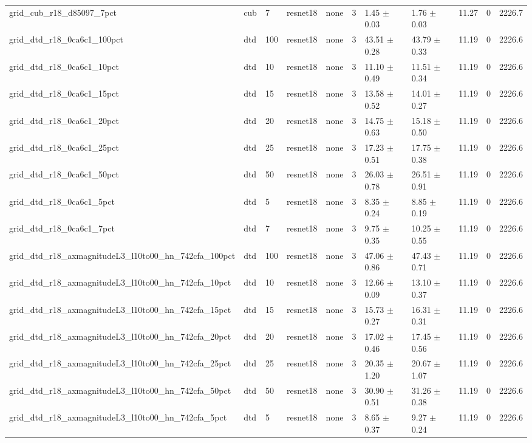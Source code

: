 \begin{tabular}{lllllllllll}
grid_cub_r18_d85097_7pct & cub & 7 & resnet18 & none & 3 & 1.45 $\pm$ 0.03 & 1.76 $\pm$ 0.03 & 11.27 & 0 & 2226.7 \\
grid_dtd_r18_0ca6c1_100pct & dtd & 100 & resnet18 & none & 3 & 43.51 $\pm$ 0.28 & 43.79 $\pm$ 0.33 & 11.19 & 0 & 2226.6 \\
grid_dtd_r18_0ca6c1_10pct & dtd & 10 & resnet18 & none & 3 & 11.10 $\pm$ 0.49 & 11.51 $\pm$ 0.34 & 11.19 & 0 & 2226.6 \\
grid_dtd_r18_0ca6c1_15pct & dtd & 15 & resnet18 & none & 3 & 13.58 $\pm$ 0.52 & 14.01 $\pm$ 0.27 & 11.19 & 0 & 2226.6 \\
grid_dtd_r18_0ca6c1_20pct & dtd & 20 & resnet18 & none & 3 & 14.75 $\pm$ 0.63 & 15.18 $\pm$ 0.50 & 11.19 & 0 & 2226.6 \\
grid_dtd_r18_0ca6c1_25pct & dtd & 25 & resnet18 & none & 3 & 17.23 $\pm$ 0.51 & 17.75 $\pm$ 0.38 & 11.19 & 0 & 2226.6 \\
grid_dtd_r18_0ca6c1_50pct & dtd & 50 & resnet18 & none & 3 & 26.03 $\pm$ 0.78 & 26.51 $\pm$ 0.91 & 11.19 & 0 & 2226.6 \\
grid_dtd_r18_0ca6c1_5pct & dtd & 5 & resnet18 & none & 3 & 8.35 $\pm$ 0.24 & 8.85 $\pm$ 0.19 & 11.19 & 0 & 2226.6 \\
grid_dtd_r18_0ca6c1_7pct & dtd & 7 & resnet18 & none & 3 & 9.75 $\pm$ 0.35 & 10.25 $\pm$ 0.55 & 11.19 & 0 & 2226.6 \\
grid_dtd_r18_axmagnitudeL3_l10to00_hn_742cfa_100pct & dtd & 100 & resnet18 & none & 3 & 47.06 $\pm$ 0.86 & 47.43 $\pm$ 0.71 & 11.19 & 0 & 2226.6 \\
grid_dtd_r18_axmagnitudeL3_l10to00_hn_742cfa_10pct & dtd & 10 & resnet18 & none & 3 & 12.66 $\pm$ 0.09 & 13.10 $\pm$ 0.37 & 11.19 & 0 & 2226.6 \\
grid_dtd_r18_axmagnitudeL3_l10to00_hn_742cfa_15pct & dtd & 15 & resnet18 & none & 3 & 15.73 $\pm$ 0.27 & 16.31 $\pm$ 0.31 & 11.19 & 0 & 2226.6 \\
grid_dtd_r18_axmagnitudeL3_l10to00_hn_742cfa_20pct & dtd & 20 & resnet18 & none & 3 & 17.02 $\pm$ 0.46 & 17.45 $\pm$ 0.56 & 11.19 & 0 & 2226.6 \\
grid_dtd_r18_axmagnitudeL3_l10to00_hn_742cfa_25pct & dtd & 25 & resnet18 & none & 3 & 20.35 $\pm$ 1.20 & 20.67 $\pm$ 1.07 & 11.19 & 0 & 2226.6 \\
grid_dtd_r18_axmagnitudeL3_l10to00_hn_742cfa_50pct & dtd & 50 & resnet18 & none & 3 & 30.90 $\pm$ 0.51 & 31.26 $\pm$ 0.38 & 11.19 & 0 & 2226.6 \\
grid_dtd_r18_axmagnitudeL3_l10to00_hn_742cfa_5pct & dtd & 5 & resnet18 & none & 3 & 8.65 $\pm$ 0.37 & 9.27 $\pm$ 0.24 & 11.19 & 0 & 2226.6 \\

\end{tabular}
